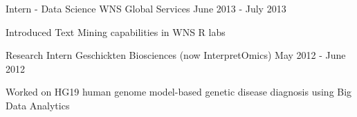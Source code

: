 \documentclass[]{awesome-cv}
\begin{document}
\begin{cventries}
{\begin{cvitems}
		 \end{cvitems} }
	\cventry
	{ Intern {-} Data Science  }
	{ WNS Global Services  }
	{}
	{ June 2013 -   July 2013 }
	{ \begin{cvitems} 		\item Introduced Text Mining capabilities in WNS R labs
		 \end{cvitems} }
	\cventry
	{ Research Intern  }
	{ Geschickten Biosciences (now InterpretOmics)  }
	{}
	{ May 2012 -   June 2012 }
	{ \begin{cvitems} 		\item Worked on HG19 human genome model{-}based genetic disease diagnosis using Big Data Analytics
		 \end{cvitems} }
\end{cventries}


\end{document}
